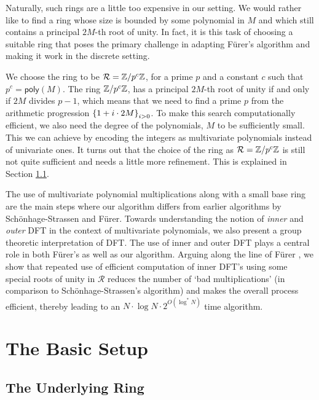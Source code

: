 \documentclass[11pt]{article}
\begin{document}
Naturally, such rings are a little too expensive in our setting. We
would rather like to find a ring whose size is bounded by some
polynomial in $M$ and which still contains a principal $2M$-th root of
unity. In fact, it is this task of choosing a suitable ring that poses
the primary challenge in adapting F\"{u}rer's algorithm and making it
work in the discrete setting.

We choose the ring to be $\mathcal{R} = \mathbb{Z}/p^c\mathbb{Z}$, for a prime $p$ and
a constant $c$ such that $p^c = \mathsf{poly}(M)$. The ring
$\mathbb{Z}/p^c\mathbb{Z}$, has a principal $2M$-th root of unity if and only if $2M$
divides $p-1$, which means that we need to find a prime $p$ from the
arithmetic progression $\left\{1 + i\cdot 2M\right\}_{i>0}$. To make this
search computationally efficient, we also need the degree of the
polynomials, $M$ to be sufficiently small. This we can achieve by
encoding the integers as multivariate polynomials instead of
univariate ones. It turns out that the choice of the ring as
$\mathcal{R} = \mathbb{Z}/p^c\mathbb{Z}$ is still not quite sufficient and needs a
little more refinement. This is explained in Section \ref{sec:ring}.

The use of multivariate polynomial multiplications along with a small
base ring are the main steps where our algorithm differs from earlier
algorithms by Sch\"{o}nhage-Strassen and F\"{u}rer. Towards
understanding the notion of \emph{inner} and \emph{outer} DFT in the
context of multivariate polynomials, we also present a group theoretic
interpretation of DFT. The use of inner
and outer DFT plays a central role in both F\"{u}rer's as well as our
algorithm. Arguing along the line of F\"{u}rer \cite{F07}, we show that
repeated use of efficient computation of inner DFT's using some
special roots of unity in $\mathcal{R}$ reduces the number of
`bad multiplications' (in comparison to Sch\"{o}nhage-Strassen's algorithm)
and makes the overall process efficient, thereby leading to an $N\cdot \log{N}\cdot 2^{O(\log^{*}{N})}$
time algorithm.


\section{The Basic Setup}

\subsection{The Underlying Ring} \label{sec:ring}
\end{document}
